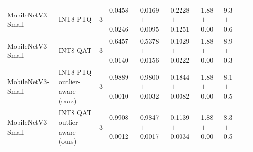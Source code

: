 \begin{table}[t]
\begin{tabular}{lllllllll}
MobileNetV3-Small & INT8 PTQ & 3 & 0.0458 $\pm$ 0.0246 & 0.0169 $\pm$ 0.0095 & 0.2228 $\pm$ 0.1251 & 1.88 $\pm$ 0.00 & 9.3 $\pm$ 0.6 & – \\
MobileNetV3-Small & INT8 QAT & 3 & 0.6457 $\pm$ 0.0140 & 0.5378 $\pm$ 0.0156 & 0.1029 $\pm$ 0.0222 & 1.88 $\pm$ 0.00 & 8.9 $\pm$ 0.3 & – \\
MobileNetV3-Small & INT8 PTQ outlier-aware (ours) & 3 & 0.9889 $\pm$ 0.0010 & 0.9800 $\pm$ 0.0032 & 0.1844 $\pm$ 0.0082 & 1.88 $\pm$ 0.00 & 8.1 $\pm$ 0.5 & – \\
MobileNetV3-Small & INT8 QAT outlier-aware (ours) & 3 & 0.9908 $\pm$ 0.0012 & 0.9847 $\pm$ 0.0017 & 0.1139 $\pm$ 0.0034 & 1.88 $\pm$ 0.00 & 8.3 $\pm$ 0.5 & – \\
\bottomrule
\end{tabular}
\end{table}
